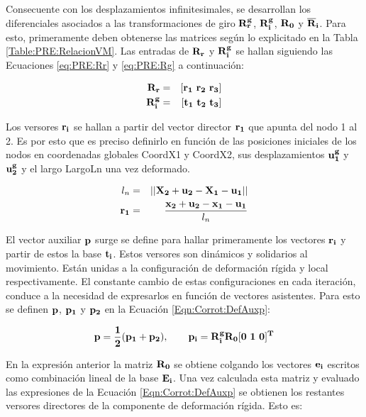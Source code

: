 Consecuente con los desplazamientos infinitesimales, se desarrollan los diferenciales asociados a las transformaciones de giro $\bf{R_r^g}$, $\bf{R_i^g}$, $\bf{R_0}$ y $\bf{\overline{R}}_i$.
Para esto, primeramente deben obtenerse las matrices según lo explicitado en la Tabla \ref{Table:PRE:RelacionVM}. Las entradas de $\bf{R}_r$ y  $\bf{R}_i^g$ se hallan siguiendo las Ecuaciones \eqref{eq:PRE:Rr} y \eqref{eq:PRE:Rg} a continuación:

\begin{eqnarray}
	\label{eq:PRE:Rr}
	\bf{R_r}&=&[\bf{r_1} ~ \bf{r_2} ~ \bf{r_3}]\\
	\label{eq:PRE:Rg}
	\bf{R}_i^g&=&[\bf{t_1} ~ \bf{t_2} ~ \bf{t_3}]
\end{eqnarray}

 Los versores $\bf{r_i}$  se hallan a partir del vector director $\bf{r_1}$ que apunta del nodo 1 al 2. Es por esto que es preciso definirlo en función de las posiciones iniciales de los nodos en coordenadas globales \gls{CoordX1} y \gls{CoordX2}, sus desplazamientos $\bf{u}_1^g$ y $\bf{u}_2^g$ y el largo \gls{LargoLn} una vez deformado.

\begin{eqnarray}
	l_n&=& ||\bf{X}_2+\bf{u}_2-\bf{X}_1-\bf{u}_1||\\
	\bf{r_1}&=&\frac{\bf{x}_2+\bf{u}_2-\bf{x}_1-\bf{u}_1}{l_n}
\end{eqnarray}

El vector auxiliar $\bf{p}$ surge se define para hallar primeramente los vectores $\bf{r}_i$ y partir de estos la base $\bf{t}_i$. Estos versores son dinámicos y solidarios al movimiento. Están unidas a la configuración de deformación rígida y local respectivamente. El constante cambio de estas configuraciones en cada iteración, conduce a la necesidad de expresarlos en función de vectores asistentes.  Para esto se definen 
$\bf{p}$, $\bf{p_1}$ y $\bf{p_2}$ en la Ecuación \eqref{Eqn:Corrot:DefAuxp}:

\begin{equation}\label{Eqn:Corrot:DefAuxp}
	\bf{p}=\frac{1}{2}(\bf{p}_1+\bf{p}_2),~~~~~~\bf{p_i}=\bf{R}_i^g\bf{R}_0[0~1~0]^T
\end{equation}

En la expresión anterior la matriz $\bf{R}_0$ se obtiene colgando los vectores $\bf{e}_i$ escritos como combinación lineal de la base $\bf{E_i}$. Una vez calculada esta matriz y evaluado las expresiones de la Ecuación \eqref{Eqn:Corrot:DefAuxp} se obtienen los restantes versores directores 
de la componente de deformación rígida. Esto es:


